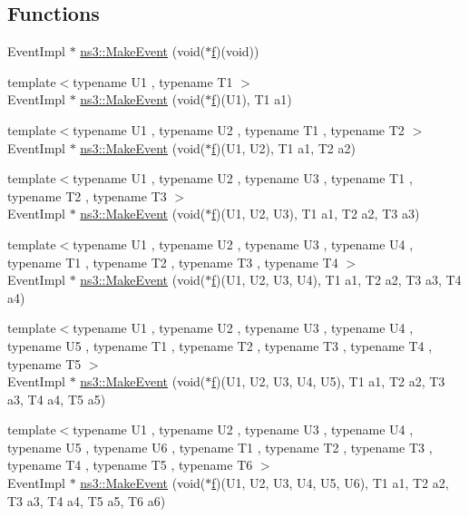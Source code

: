 \subsection*{Functions}
\begin{DoxyCompactItemize}
\item 
Event\+Impl $\ast$ \hyperlink{group__makeeventfnptr_ga289a28a2497c18a9bd299e5e2014094b}{ns3\+::\+Make\+Event} (void($\ast$\hyperlink{80211b_8c_ae7ffc1a8f84fa47a0812b2f2b9627132}{f})(void))
\item 
{\footnotesize template$<$typename U1 , typename T1 $>$ }\\Event\+Impl $\ast$ \hyperlink{group__makeeventfnptr_ga77719a993ef7956d37a08a121a935074}{ns3\+::\+Make\+Event} (void($\ast$\hyperlink{80211b_8c_ae7ffc1a8f84fa47a0812b2f2b9627132}{f})(U1), T1 a1)
\item 
{\footnotesize template$<$typename U1 , typename U2 , typename T1 , typename T2 $>$ }\\Event\+Impl $\ast$ \hyperlink{group__makeeventfnptr_gadce4336b09c86b3f7ed8da03859375ba}{ns3\+::\+Make\+Event} (void($\ast$\hyperlink{80211b_8c_ae7ffc1a8f84fa47a0812b2f2b9627132}{f})(U1, U2), T1 a1, T2 a2)
\item 
{\footnotesize template$<$typename U1 , typename U2 , typename U3 , typename T1 , typename T2 , typename T3 $>$ }\\Event\+Impl $\ast$ \hyperlink{group__makeeventfnptr_ga56dc5a484a0cf8bc6e42dbb01af7edfa}{ns3\+::\+Make\+Event} (void($\ast$\hyperlink{80211b_8c_ae7ffc1a8f84fa47a0812b2f2b9627132}{f})(U1, U2, U3), T1 a1, T2 a2, T3 a3)
\item 
{\footnotesize template$<$typename U1 , typename U2 , typename U3 , typename U4 , typename T1 , typename T2 , typename T3 , typename T4 $>$ }\\Event\+Impl $\ast$ \hyperlink{group__makeeventfnptr_gafd43cc9c6606afb312d7781cca544cbc}{ns3\+::\+Make\+Event} (void($\ast$\hyperlink{80211b_8c_ae7ffc1a8f84fa47a0812b2f2b9627132}{f})(U1, U2, U3, U4), T1 a1, T2 a2, T3 a3, T4 a4)
\item 
{\footnotesize template$<$typename U1 , typename U2 , typename U3 , typename U4 , typename U5 , typename T1 , typename T2 , typename T3 , typename T4 , typename T5 $>$ }\\Event\+Impl $\ast$ \hyperlink{group__makeeventfnptr_gaa6a1fb3f6bd167d89e3581ae25bd1e93}{ns3\+::\+Make\+Event} (void($\ast$\hyperlink{80211b_8c_ae7ffc1a8f84fa47a0812b2f2b9627132}{f})(U1, U2, U3, U4, U5), T1 a1, T2 a2, T3 a3, T4 a4, T5 a5)
\item 
{\footnotesize template$<$typename U1 , typename U2 , typename U3 , typename U4 , typename U5 , typename U6 , typename T1 , typename T2 , typename T3 , typename T4 , typename T5 , typename T6 $>$ }\\Event\+Impl $\ast$ \hyperlink{group__makeeventfnptr_ga8026dc0015686f8f7588a4ba07f383e2}{ns3\+::\+Make\+Event} (void($\ast$\hyperlink{80211b_8c_ae7ffc1a8f84fa47a0812b2f2b9627132}{f})(U1, U2, U3, U4, U5, U6), T1 a1, T2 a2, T3 a3, T4 a4, T5 a5, T6 a6)
\end{DoxyCompactItemize}
